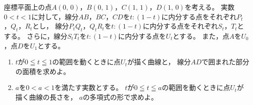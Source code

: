 \documentclass[../../main.tex]{subfiles}
\begin{document}
座標平面上の点$A(0, \, 0)$，$B(0, \, 1)$，$C(1, \, 1)$，$D(1, \, 0)$を考える。
実数$0<t<1$に対して，線分$AB$，$BC$，$CD$を$t:(1-t)$に内分する点をそれぞれ$P_t$，$Q_t$，$R_t$とし，
線分$P_tQ_t$，$Q_tR_t$を$t:(1-t)$に内分する点をそれぞれ$S_t$，$T_t$とする。
さらに，線分$S_tT_t$を$t:(1-t)$に内分する点を$U_t$とする。
また，点$A$を$U_0$，点$D$を$U_1$とする。
\begin{enumerate}
  $U_t$の座標を求めよ。
  \item$t$が$0 \leqq t \leqq 1$の範囲を動くときに点$U_t$が描く曲線と，
    線分$AD$で囲まれた部分の面積を求めよ。
  \item$a$を$0<a<1$を満たす実数とする。
    $t$が$0 \leqq t \leqq a$の範囲を動くときに点$U_t$が描く曲線の長さを，
    $a$の多項式の形で求めよ。
\end{enumerate}
\end{document}
